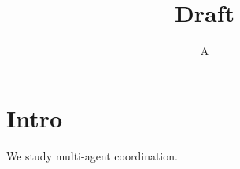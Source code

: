 \documentclass{article}
\begin{document}
\title{Draft}\author{A}\maketitle
\section{Intro}
We study multi-agent coordination. %
\end{document}

